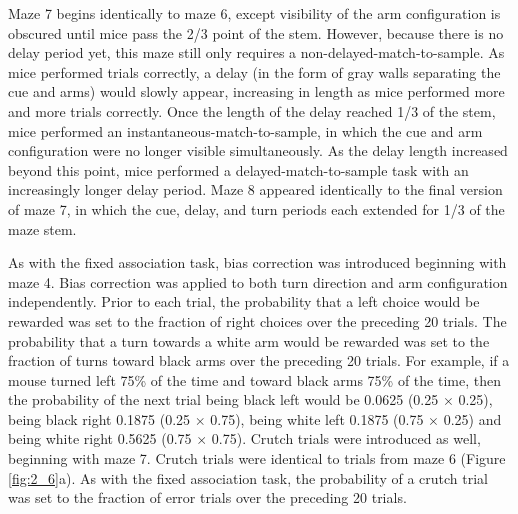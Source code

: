 \bigskip
Maze 7 begins identically to maze 6, except visibility of the arm configuration is obscured until mice pass the 2/3 point of the stem. However, because there is no delay period yet, this maze still only requires a non-delayed-match-to-sample. As mice performed trials correctly, a delay (in the form of gray walls separating the cue and arms) would slowly appear, increasing in length as mice performed more and more trials correctly. Once the length of the delay reached 1/3 of the stem, mice performed an instantaneous-match-to-sample, in which the cue and arm configuration were no longer visible simultaneously. As the delay length increased beyond this point, mice performed a delayed-match-to-sample task with an increasingly longer delay period. Maze 8 appeared identically to the final version of maze 7, in which the cue, delay, and turn periods each extended for 1/3 of the maze stem.

\bigskip
As with the fixed association task, bias correction was introduced beginning with maze 4. Bias correction was applied to both turn direction and arm configuration independently. Prior to each trial, the probability that a left choice would be rewarded was set to the fraction of right choices over the preceding 20 trials. The probability that a turn towards a white arm would be rewarded was set to the fraction of turns toward black arms over the preceding 20 trials. For example, if a mouse turned left 75\% of the time and toward black arms 75\% of the time, then the probability of the next trial being black left would be 0.0625 (0.25 $\times$ 0.25), being black right 0.1875 (0.25 $\times$ 0.75), being white left 0.1875 (0.75 $\times$ 0.25) and being white right 0.5625 (0.75 $\times$ 0.75). Crutch trials were introduced as well, beginning with maze 7. Crutch trials were identical to trials from maze 6 (Figure \ref{fig:2_6}a). As with the fixed association task, the probability of a crutch trial was set to the fraction of error trials over the preceding 20 trials. 

